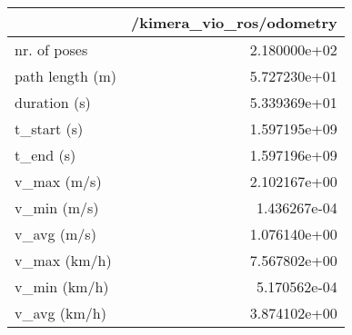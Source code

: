 \begin{tabular}{lr}
\toprule
{} &  /kimera\_vio\_ros/odometry \\
\midrule
nr. of poses    &              2.180000e+02 \\
path length (m) &              5.727230e+01 \\
duration (s)    &              5.339369e+01 \\
t\_start (s)     &              1.597195e+09 \\
t\_end (s)       &              1.597196e+09 \\
v\_max (m/s)     &              2.102167e+00 \\
v\_min (m/s)     &              1.436267e-04 \\
v\_avg (m/s)     &              1.076140e+00 \\
v\_max (km/h)    &              7.567802e+00 \\
v\_min (km/h)    &              5.170562e-04 \\
v\_avg (km/h)    &              3.874102e+00 \\
\bottomrule
\end{tabular}
